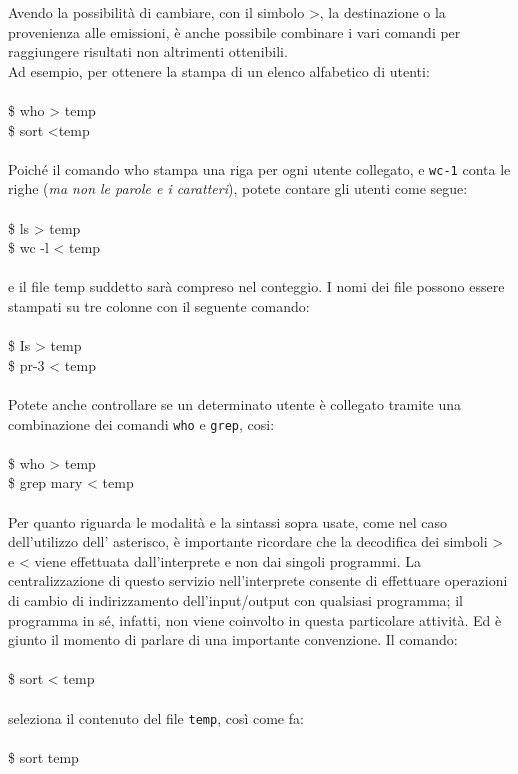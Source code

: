 Avendo la possibilità di cambiare, con il simbolo >, la destinazione o
 la provenienza alle emissioni, è anche possibile combinare i vari comandi per raggiungere risultati non altrimenti ottenibili.\\
Ad esempio, per ottenere la stampa di un elenco alfabetico di utenti:\\\\
\$ who > temp\\
\$ sort <temp\\\\
Poiché il comando who stampa una riga per ogni utente collegato, e \lstinline|wc-1| conta le righe (\textit{ma non le parole e i caratteri}), potete contare gli utenti come segue:\\\\
\$ ls > temp\\
\$ wc -l < temp\\\\
e il file temp suddetto sarà compreso nel conteggio. I nomi dei file possono essere
stampati su tre colonne con il seguente comando:\\\\
\$ Is > temp\\
\$ pr-3 < temp\\\\
Potete anche controllare se un determinato utente è collegato tramite una combinazione dei comandi \lstinline|who| e \lstinline|grep|, cosi:\\\\
\$ who > temp\\
\$ grep mary < temp\\\\
Per quanto riguarda le modalità e la sintassi sopra usate, come nel caso dell'utilizzo
dell' asterisco, è importante ricordare che la decodifica dei simboli > e < viene effettuata dall'interprete e non dai singoli programmi. La centralizzazione di questo servizio nell'interprete consente di effettuare operazioni di cambio di indirizzamento
dell'input/output con qualsiasi programma; il programma in sé, infatti, non viene
coinvolto in questa particolare attività. Ed è giunto il momento di parlare di una importante convenzione. Il comando:\\\\
\$ sort < temp\\\\
seleziona il contenuto del file \lstinline|temp|, così come fa:\\\\
\$ sort temp\\\\
